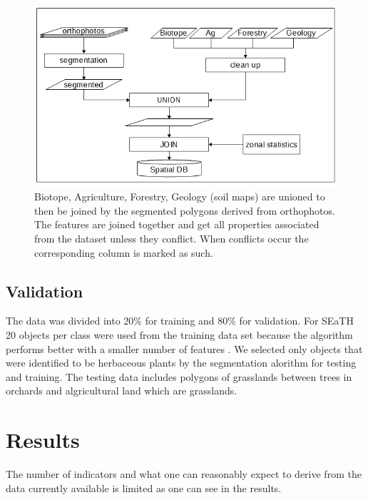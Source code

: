 \documentclass[authoryear, review,12pt,number]{elsarticle}
\begin{document}
\begin{figure} \includegraphics[width=1\textwidth]{diagrams/pre_processing.png}
    \caption{Biotope, Agriculture, Forestry, Geology (soil maps) are unioned to
    then be joined by the segmented polygons derived from orthophotos. The
    features are joined together and get all properties associated from the
    dataset unless they conflict. When conflicts occur the corresponding column
    is marked as such.}
\label{fig_pre-processing}
\end{figure}

\subsection{Validation} 
The data was divided into 20\% for training and 80\% for validation. For SEaTH
20 objects per class were used from the training data set because the algorithm
performs better with a smaller number of features \citep{Nussbaum2006}. We 
selected only objects that were identified to be herbaceous plants by the 
segmentation alorithm for testing and training. The testing 
data includes polygons of grasslands between trees in orchards and 
algricultural land which are grasslands. %

\section{Results}
The number of indicators and what one can reasonably expect to derive from the
data currently available is limited as one can see in the results.
\end{document}
